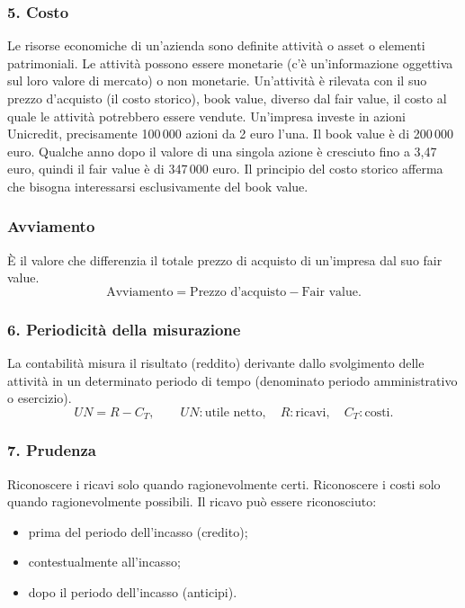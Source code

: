 \documentclass[11pt,a4paper]{article}
\newcommand{\orig}[1]{\clearpage}
\begin{document}
\subsubsection*{5. Costo}
Le risorse economiche di un'azienda sono definite attività o asset o elementi patrimoniali.
Le attività possono essere monetarie (c'è un'informazione oggettiva sul loro valore di mercato) o non monetarie.
Un'attività è rilevata con il suo prezzo d'acquisto (il costo storico), book value, diverso dal fair value, il costo al quale le attività potrebbero essere vendute.
\orig{21}
Un'impresa investe in azioni Unicredit, precisamente 100\,000 azioni da 2 euro l'una. Il book value è di 200\,000 euro. Qualche anno dopo il valore di una singola azione è cresciuto fino a 3,47 euro, quindi il fair value è di 347\,000 euro.
Il principio del costo storico afferma che bisogna interessarsi esclusivamente del book value.
\subsubsection*{Avviamento}
È il valore che differenzia il totale prezzo di acquisto di un'impresa dal suo fair value.
\[\text{Avviamento}=\text{Prezzo d'acquisto}-\text{Fair value}.\]
\subsubsection*{6. Periodicità della misurazione}
La contabilità misura il risultato (reddito) derivante dallo svolgimento delle attività in un determinato periodo di tempo (denominato periodo amministrativo o esercizio).
\[UN=R-C_T,\qquad UN:\text{utile netto},\quad R:\text{ricavi},\quad C_T:\text{costi}.\]
\orig{22}\subsubsection*{7. Prudenza}
Riconoscere i ricavi solo quando ragionevolmente certi. Riconoscere i costi solo quando ragionevolmente possibili.
Il ricavo può essere riconosciuto:
\begin{itemize}
\item prima del periodo dell'incasso (credito);
\item contestualmente all'incasso;
\item dopo il periodo dell'incasso (anticipi).
\end{itemize}
\end{document}

